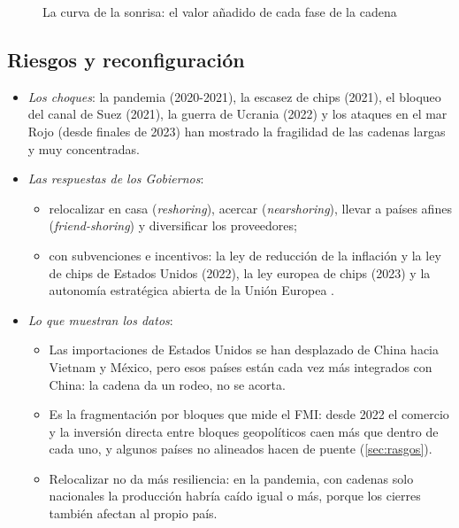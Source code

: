 \documentclass[11pt]{article}
\begin{document}
\begin{figure}[H]
\centering
\caption{La curva de la sonrisa: el valor añadido de cada fase de la cadena}\label{fig:curva-sonrisa}
\end{figure}

\subsection{Riesgos y reconfiguración}\label{sec:cgv-reconfiguracion}

\begin{itemize}
\item \emph{Los choques}: la pandemia (2020-2021), la escasez de chips (2021), el bloqueo del canal de Suez (2021), la guerra de Ucrania (2022) y los ataques en el mar Rojo (desde finales de 2023) han mostrado la fragilidad de las cadenas largas y muy concentradas.
\item \emph{Las respuestas de los Gobiernos}:
  \begin{itemize}
  \item relocalizar en casa (\emph{reshoring}), acercar (\emph{nearshoring}), llevar a países afines (\emph{friend-shoring}) y diversificar los proveedores;
  \item con subvenciones e incentivos: la ley de reducción de la inflación y la ley de chips de Estados Unidos (2022), la ley europea de chips (2023) y la autonomía estratégica abierta de la Unión Europea .
  \end{itemize}
\item \emph{Lo que muestran los datos}:
  \begin{itemize}
  \item Las importaciones de Estados Unidos se han desplazado de China hacia Vietnam y México, pero esos países están cada vez más integrados con China: la cadena da un rodeo, no se acorta\nocite{Freund2024Reshaping,AlfaroChor2023}.
  \item Es la fragmentación por bloques que mide el FMI: desde 2022 el comercio y la inversión directa entre bloques geopolíticos caen más que dentro de cada uno, y algunos países no alineados hacen de puente (\ref{sec:rasgos})\nocite{Gopinath2025Linkages}.
  \item Relocalizar no da más resiliencia: en la pandemia, con cadenas solo nacionales la producción habría caído igual o más, porque los cierres también afectan al propio país\nocite{Bonadio2021Supply}.

\end{itemize}
\end{itemize}
\end{document}
